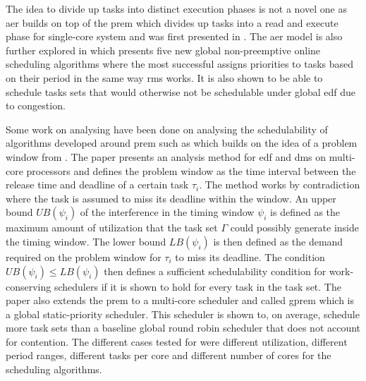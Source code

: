 \documentclass{kththesis}
\begin{document}
The idea to divide up tasks into distinct execution phases is not a novel one as \acrshort{aer}
builds on top of the \acrshort{prem} which divides up tasks into a read and execute phase for
single-core system and was first presented in \parencite{pellizzoni_predictable_2011}. The
\acrshort{aer} model is also further explored in \parencite{maia_closer_2016} which presents five
new global non-preemptive online scheduling algorithms where the most successful assigns priorities
to tasks based on their period in the same way \acrshort{rms} works. It is also shown to be able to
schedule tasks sets that would otherwise not be schedulable under global \acrshort{edf} due to
congestion.

Some work on analysing have been done on analysing the schedulability of algorithms developed around
\acrshort{prem} such as \parencite{alhammad_schedulability_2014} which builds on the idea of a
problem window from \parencite{baker_multiprocessor_2003}. The paper presents an analysis method for
\acrshort{edf} and \acrfull{dms} on multi-core processors and defines the problem window as the
time interval between the release time and deadline of a certain task $ \tau_i $. The method works
by contradiction where the task is assumed to miss its deadline within the window. An upper bound $
UB(\psi_i) $ of the interference in the timing window $ \psi_i $ is defined as the maximum amount of
utilization that the task set $ \Gamma $ could possibly generate inside the timing window. The lower
bound $ LB(\psi_i) $ is then defined as the demand required on the problem window for $ \tau_i $ to
miss its deadline. The condition $ UB(\psi_i) \le LB(\psi_i) $ then defines a sufficient
schedulability condition for work-conserving schedulers if it is shown to hold for every task in the
task set. The paper also extends the \acrshort{prem} to a multi-core scheduler and called
\acrshort{gprem} which is a global static-priority scheduler. This scheduler is shown to, on
average, schedule more task sets than a baseline global round robin scheduler that does not account
for contention. The different cases tested for were different utilization, different period ranges,
different tasks per core and different number of cores for the scheduling algorithms.
\end{document}
